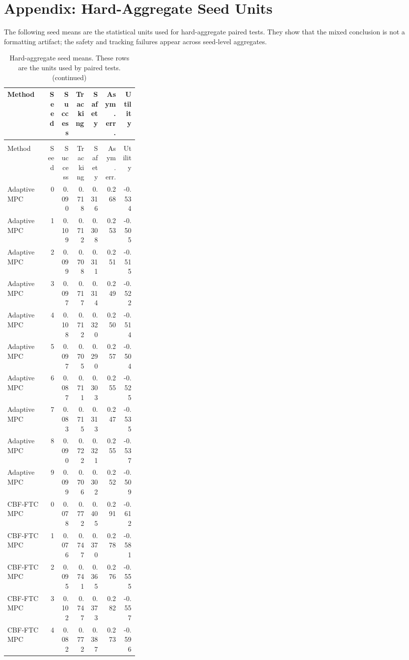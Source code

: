 \documentclass{article}
\begin{document}
\section{Appendix: Hard-Aggregate Seed Units}
The following seed means are the statistical units used for hard-aggregate paired tests. They show that the mixed conclusion is not a formatting artifact; the safety and tracking failures appear across seed-level aggregates.
\begin{center}
\tiny
\begin{longtable}{p{0.31\linewidth}rrrrrr}
\caption{Hard-aggregate seed means. These rows are the units used by paired tests.}\label{tab:hard-seed}\\
\toprule
Method & Seed & Success & Tracking & Safety & Asym. err. & Utility\\
\midrule
\endfirsthead
\caption[]{Hard-aggregate seed means. These rows are the units used by paired tests. (continued)}\\
\toprule
Method & Seed & Success & Tracking & Safety & Asym. err. & Utility\\
\midrule
\endhead
Adaptive MPC & 0 & 0.090 & 0.718 & 0.316 & 0.268 & -0.534\\
Adaptive MPC & 1 & 0.109 & 0.712 & 0.308 & 0.253 & -0.505\\
Adaptive MPC & 2 & 0.099 & 0.708 & 0.311 & 0.251 & -0.515\\
Adaptive MPC & 3 & 0.097 & 0.717 & 0.314 & 0.249 & -0.522\\
Adaptive MPC & 4 & 0.108 & 0.712 & 0.320 & 0.250 & -0.514\\
Adaptive MPC & 5 & 0.097 & 0.705 & 0.290 & 0.257 & -0.504\\
Adaptive MPC & 6 & 0.087 & 0.711 & 0.303 & 0.255 & -0.525\\
Adaptive MPC & 7 & 0.083 & 0.715 & 0.313 & 0.247 & -0.535\\
Adaptive MPC & 8 & 0.090 & 0.722 & 0.321 & 0.255 & -0.537\\
Adaptive MPC & 9 & 0.099 & 0.706 & 0.302 & 0.252 & -0.509\\
CBF-FTC MPC & 0 & 0.078 & 0.772 & 0.405 & 0.291 & -0.612\\
CBF-FTC MPC & 1 & 0.076 & 0.747 & 0.370 & 0.278 & -0.581\\
CBF-FTC MPC & 2 & 0.095 & 0.741 & 0.365 & 0.276 & -0.555\\
CBF-FTC MPC & 3 & 0.102 & 0.747 & 0.373 & 0.282 & -0.557\\
CBF-FTC MPC & 4 & 0.082 & 0.772 & 0.387 & 0.273 & -0.596\\

\end{longtable}
\end{center}
\end{document}
